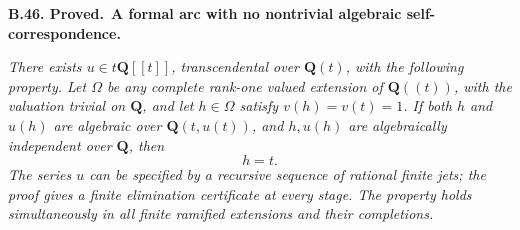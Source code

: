 \documentclass[11pt,a4paper]{article}
\newcommand{\Q}{\mathbf Q}
\newenvironment{claim}[3]{\par\medskip\noindent\hypertarget{#1}{\textbf{#1. #2.}}\ \textbf{#3.}\par\nopagebreak\smallskip\begingroup\itshape}{\endgroup\par\smallskip}
\begin{document}
\begin{claim}{B.46}{Proved}{A formal arc with no nontrivial algebraic self-correspondence}
There exists \(u\in t\Q[[t]]\), transcendental over \(\Q(t)\), with
the following property. Let \(\Omega\) be any complete rank-one valued extension
of \(\Q((t))\), with the valuation trivial on \(\Q\), and let
\(h\in\Omega\) satisfy \(v(h)=v(t)=1\). If both \(h\) and
\(u(h)\) are algebraic over \(\Q(t,u(t))\), and \(h,u(h)\) are
algebraically independent over \(\Q\), then
\[
                         h=t.                            \tag{B.CF.3}
\]
The series \(u\) can be specified by a recursive sequence of rational
finite jets; the proof gives a finite elimination certificate at every
stage. The property holds simultaneously in all finite ramified
extensions and their completions.
\end{claim}
\end{document}

